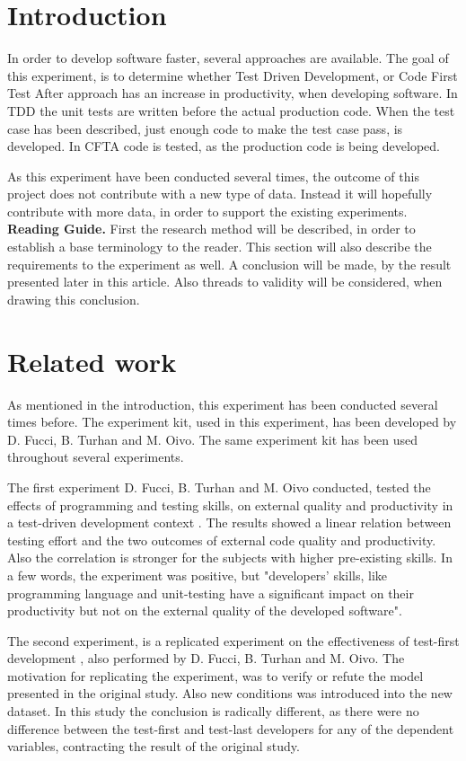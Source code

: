 \documentclass{sig-alternate-05-2015}
\begin{document}
\section{Introduction}
In order to develop software faster, several approaches are available. The goal of this experiment, is to determine whether Test Driven Development, or Code First Test After approach has an increase in productivity, when developing software. In TDD the unit tests are written before the actual production code. When the test case has been described, just enough code to make the test case pass, is developed.
In CFTA code is tested, as the production code is being developed.

As this experiment have been conducted several times, the outcome of this project does not contribute with a new type of data. Instead it will hopefully contribute with more data, in order to support the existing experiments.\\
[0.5em]
\textbf{Reading Guide.}
First the research method will be described, in order to establish a base terminology to the reader. This section will also describe the requirements to the experiment as well.
A conclusion will be made, by the result presented later in this article. Also threads to validity will be considered, when drawing this conclusion.

\section{Related work}
As mentioned in the introduction, this experiment has been conducted several times before. The experiment kit, used in this experiment, has been developed by D. Fucci, B. Turhan and M. Oivo. The same experiment kit has been used throughout several experiments.

The first experiment D. Fucci, B. Turhan and M. Oivo conducted, tested the effects of programming and testing skills, on external quality and productivity in a test-driven development context \cite{fucci1}. The results showed a linear relation between testing effort and the two outcomes of external code quality and productivity. Also the correlation is stronger for the subjects with higher pre-existing skills. In a few words, the experiment was positive, but "developers' skills, like programming language and unit-testing have a significant impact on their productivity but not on the external quality of the developed software".

The second experiment, is a replicated experiment on the effectiveness of test-first development \cite{fucci2}, also performed by D. Fucci, B. Turhan and M. Oivo. The motivation for replicating the experiment, was to verify or refute the model presented in the original study. Also new conditions was introduced into the new dataset.
In this study the conclusion is radically different, as there were no difference between the test-first and test-last developers for any of the dependent variables, contracting the result of the original study.
\end{document}
